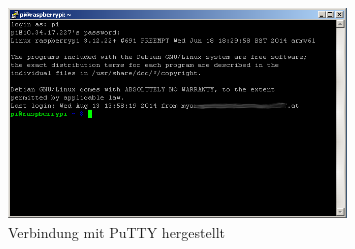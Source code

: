 \begin{figure}[h!]
	\centering
		\includegraphics[width=0.8\textwidth]{./fotos/putty2.png}
	\caption{Verbindung mit PuTTY hergestellt}
	\label{fig:putty2}
\end{figure}



